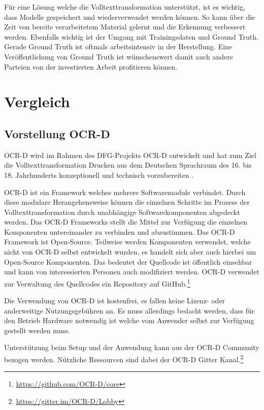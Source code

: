 \documentclass[a4paper,oneside, 12pt]{report}
\begin{document}
Für eine Lösung welche die Volltexttransformation unterstützt, ist es wichtig, dass Modelle gespeichert und wiederverwendet werden können. So kann über die Zeit von bereits verarbeitetem Material gelernt und die Erkennung verbessert werden. Ebenfalls wichtig ist der Umgang mit Trainingsdaten und Ground Truth. Gerade Ground Truth ist oftmals arbeitsintensiv in der Herstellung. Eine Veröffentlichung von Ground Truth ist wünschenswert damit auch andere Parteien von der investierten Arbeit profitieren können.

\chapter{Vergleich}\label{sec:vergleich}

\section{Vorstellung OCR-D}
OCR-D wird im Rahmen des DFG-Projekts OCR-D entwickelt und hat zum Ziel die Volltexttransformation Drucken aus dem Deutschen Sprachraum des 16. bis 18. Jahrhunderts konzeptionell und technisch vorzubereiten \cite{standOCR-D}. 

OCR-D ist ein Framework welches mehrere Softwaremodule verbindet. Durch diese modulare Herangehensweise können die einzelnen Schritte im Prozess der Volltexttransformation durch unabhängige Softwarekomponenten abgedeckt werden. Das OCR-D Frameworks stellt die Mittel zur Verfügung die einzelnen Komponenten untereinander zu verbinden und abzustimmen. Das OCR-D Framework ist Open-Source. Teilweise werden Komponenten verwendet, welche nicht von OCR-D selbst entwickelt wurden, es handelt sich aber auch hierbei um Open-Source Komponenten. Das bedeutet der Quellcode ist öffentlich einsehbar und kann von interessierten Personen auch modifiziert werden. OCR-D verwendet zur Verwaltung des Quellcodes ein Repository auf GitHub.\footnote{\url{https://github.com/OCR-D/core}}

Die Verwendung von OCR-D ist kostenfrei, es fallen keine Lizenz- oder anderweitige Nutzungsgebühren an. Es muss allerdings bedacht werden, dass für den Betrieb Hardware notwendig ist welche vom Anwender selbst zur Verfügung gestellt werden muss. \cite{ocrdfaq}

Unterstützung beim Setup und der Anwendung kann aus der OCR-D Community bezogen werden. Nützliche Ressourcen sind dabei der OCR-D Gitter Kanal.\footnote{\url{https://gitter.im/OCR-D/Lobby}}
\end{document}
